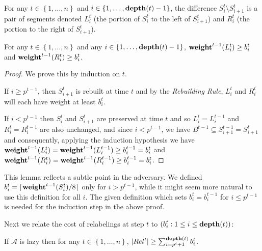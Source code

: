 \documentclass[unicode,review]{siamart1116}
\newcommand{\A}{\mathcal{A}}
\newcommand{\natInt}[2]{ \left\{ #1, \dotsc, #2 \right\} }
\newcommand{\weight}{{\rm {\bf weight}}}
\newcommand{\depth}{{\rm {\bf depth}}}
\numberwithin{theorem}{section}
\begin{document}
For any $t \in \natInt{1}{n}$ and $i \in \natInt{1}{\depth(t)-1}$, the
difference $S^t_i \setminus S^t_{i+1}$ is a pair of segments 
denoted $L^t_i$ (the portion of $S^t_i$ to the left of $S^t_{i+1}$)
and $R^t_i$ (the portion to the right of $S^t_{i+1}$).

\begin{lemma}
\label{l-b}  For  any $t \in \natInt{1}{n}$ and any $i \in \natInt{1}{\depth(t)-1}$, $\weight^{t-1}(L^t_i) \geq b^t_i$
and $\weight^{t-1}(R^t_i) \geq b^t_i$.
\end{lemma}

\begin{proof}
We prove this by induction on $t$.  

If $i \ge  p^{t-1}$, then $S^t_{i+1}$ is rebuilt at time $t$ and by the \emph{Rebuilding Rule},
$L^t_i$ and $R^t_i$ will each have weight at least $b^t_i$.

If $i < p^{t-1}$ then $S^t_i$ and $S^t_{i+1}$ are preserved at time $t$ and so $L^t_i=L^{t-1}_i$ and $R^t_i=R^{t-1}_i$
are also unchanged, and since $i < p^{t-1}$, 
we have $B^{t-1} \subseteq S^{t-1}_{i+1}=S^{t}_{i+1}$
and consequently, applying the induction hypothesis
we have $\weight^{t-1}(L^t_i)=\weight^{t-1}(L^{t-1}_i) \geq b^{t-1}_i=b^t_i$ 
and $\weight^{t-1}(R^t_i)=\weight^{t-1}(R^{t-1}_i) \geq b^{t-1}_i=b^t_i$.  
\end{proof}

This lemma reflects a subtle point in the adversary.  We defined $b^t_i=\lceil \weight^{t-1}(S^t_i)/8 \rceil$ only for $i >p^{t-1}$,
while it might seem more natural to use this definition for all $i$. 
The given definition which sets $b^t_i=b^{t-1}_i$ for $i \leq p^{t-1}$ is
needed for the induction step in the above proof.

Next we relate the cost of relabelings at step $t$ to $(b^t_i:1 \leq i \leq \depth(t))$:

\begin{lemma}
\label{l-rel}
If $\A$ is lazy then for any $t \in \natInt{1}{n}$, $|Rel^t| \ge \sum_{i=p^t+1}^{\depth(t)} b^t_i$.
\end{lemma}
\end{document}
